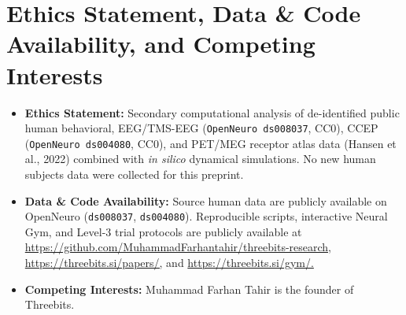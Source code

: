 \documentclass[11pt,a4paper]{article}
\begin{document}
\section*{Ethics Statement, Data \& Code Availability, and Competing Interests}
\begin{itemize}
\item \textbf{Ethics Statement:} Secondary computational analysis of de-identified public human behavioral, EEG/TMS-EEG (\texttt{OpenNeuro ds008037}, CC0), CCEP (\texttt{OpenNeuro ds004080}, CC0), and PET/MEG receptor atlas data (Hansen et al., 2022) combined with \emph{in silico} dynamical simulations. No new human subjects data were collected for this preprint.
\item \textbf{Data \& Code Availability:} Source human data are publicly available on OpenNeuro (\texttt{ds008037}, \texttt{ds004080}). Reproducible scripts, interactive Neural Gym, and Level-3 trial protocols are publicly available at \url{https://github.com/MuhammadFarhantahir/threebits-research,} \url{https://threebits.si/papers/,} and \url{https://threebits.si/gym/.}
\item \textbf{Competing Interests:} Muhammad Farhan Tahir is the founder of Threebits.
\end{itemize}
\end{document}
